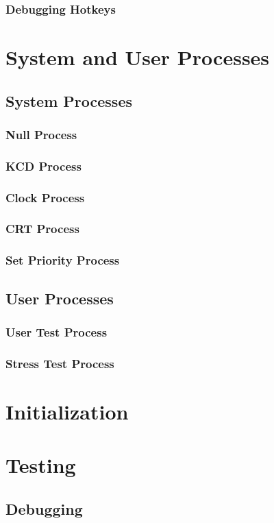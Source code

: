 \documentclass[12pt]{article}
\begin{document}
\subsubsection{Debugging Hotkeys}
\newpage
\section{System and User Processes}
\subsection{System Processes}
\subsubsection{Null Process}
\subsubsection{KCD Process}
\subsubsection{Clock Process}
\subsubsection{CRT Process}
\subsubsection{Set Priority Process}
\subsection{User Processes}
\subsubsection{User Test Process}
\subsubsection{Stress Test Process}
\newpage
\section{Initialization}
\newpage
\section{Testing}
\subsection{Debugging}
\end{document}
